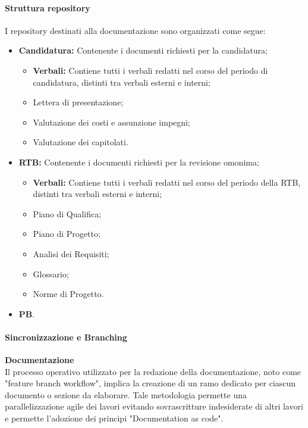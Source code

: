 \paragraph{Struttura repository}
I repository destinati alla documentazione sono organizzati come segue:
\begin{itemize}
    \item \textbf{Candidatura:} Contenente i documenti richiesti per la candidatura;
          \begin{itemize}
              \item \textbf{Verbali:} Contiene tutti i verbali redatti nel corso del periodo di candidatura, distinti tra verbali esterni e interni;
              \item Lettera di presentazione;
              \item Valutazione dei costi e assunzione impegni;
              \item Valutazione dei capitolati.
          \end{itemize}
    \item \textbf{RTB:} Contenente i documenti richiesti per la revisione omonima;
          \begin{itemize}
              \item \textbf{Verbali:} Contiene tutti i verbali redatti nel corso del periodo della RTB, distinti tra verbali esterni e interni;
              \item Piano di Qualifica;
              \item Piano di Progetto;
              \item Analisi dei Requisiti;
              \item Glossario;
              \item Norme di Progetto.
          \end{itemize}
    \item \textbf{PB}.
\end{itemize}


\paragraph{Sincronizzazione e Branching}
\label{par:sincronizzazione-e-branching}
\textbf{Documentazione} \\
Il processo operativo utilizzato per la redazione della documentazione, noto come "feature branch workflow", implica la creazione di un ramo dedicato per ciascun documento o sezione da elaborare.
Tale metodologia permette una parallelizzazione agile dei lavori evitando sovrascritture indesiderate di altri lavori e permette l'adozione dei principi "Documentation as code". \\ %

